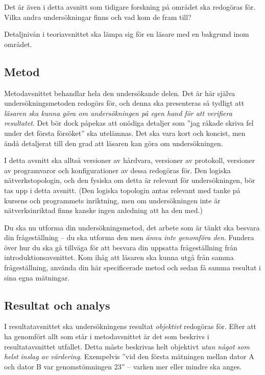 \documentclass[a4paper]{miunasgn}
\begin{document}
Det är även i detta avsnitt som tidigare forskning på området ska redogöras 
för.
Vilka andra undersökningar finns och vad kom de fram till?

Detaljnivån i teoriavsnittet ska lämpa sig för en läsare med en bakgrund inom 
området.

\subsection{Metod}

Metodavsnittet behandlar hela den undersökande delen.
Det är här själva undersökningsmetoden redogörs för, och denna ska presenteras 
så tydligt att \emph{läsaren ska kunna göra om undersökningen på egen hand för 
att verifiera resultatet}.
Det bör dock påpekas att onödiga detaljer som ''jag råkade skriva fel under det 
första försöket'' ska utelämnas.
Det ska vara kort och koncist, men ändå detaljerat till den grad att läsaren 
kan göra om undersökningen.

I detta avsnitt ska alltså versioner av hårdvara, versioner av protokoll, 
versioner av programvaror och konfigurationer av dessa redogöras för.
Den logiska nätverkstopologin, och den fysiska om detta är relevant för 
undersökningen, bör tas upp i detta avsnitt.
(Den logiska topologin antas relevant med tanke på kursens och programmets 
inriktning, men om undersökningen inte är nätverksinriktad finns kanske ingen 
anledning att ha den med.)

Du ska nu utforma din undersökningsmetod, det arbete som är tänkt ska besvara 
din frågeställning -- du ska utforma den men \emph{ännu inte genomföra den}.
Fundera över hur du ska gå tillväga för att besvara din uppsatta frågeställning 
från introduktionsavsnittet.
Kom ihåg att läsaren ska kunna utgå från samma frågeställning, använda din här 
specificerade metod och sedan få samma resultat i sina egna mätningar.

\subsection{Resultat och analys}

I resultatavsnittet ska undersökningens resultat \emph{objektivt} redogöras 
för.
Efter att ha genomfört allt som står i metodavsnittet är det som beskrivs 
i resultatavsnittet utfallet.
Detta måste beskrivas helt objektivt \emph{utan något som helst inslag av 
värdering}.
Exempelvis ''vid den första mätningen mellan dator A och dator B var 
genomstömningen \unit{23}{\mega\bit\per\second}'' -- varken mer eller mindre 
ska anges.
\end{document}
